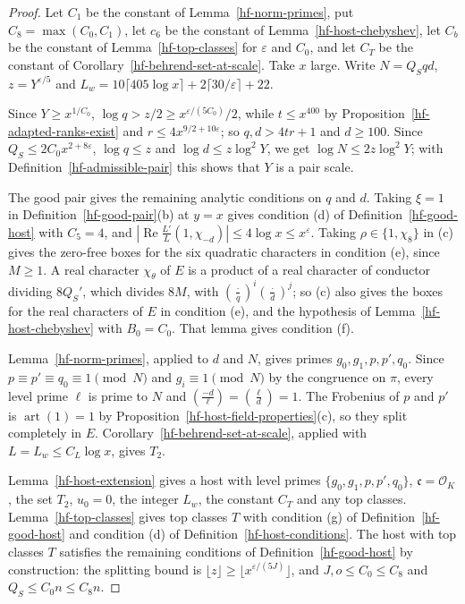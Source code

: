 \begin{proof}
Let $C_1$ be the constant of Lemma~\ref{hf-norm-primes}, put $C_8=\max(C_0,C_1)$, let $c_6$ be the
constant of Lemma~\ref{hf-host-chebyshev}, let $C_b$ be the constant of Lemma~\ref{hf-top-classes}
for $\varepsilon$ and $C_0$, and let $C_T$ be the constant of Corollary~\ref{hf-behrend-set-at-scale}.
Take $x$ large. Write $N=Q_Sqd$, $z=Y^{\varepsilon/5}$ and $L_w=10\lceil405\log x\rceil+
2\lceil30/\varepsilon\rceil+22$.

Since $Y\geq x^{1/C_0}$, $\log q>z/2\geq x^{\varepsilon/(5C_0)}/2$, while $t\leq x^{400}$ by
Proposition~\ref{hf-adapted-ranks-exist} and $r\leq4x^{9/2+10\varepsilon}$; so $q,d>4tr+1$ and
$d\geq100$. Since $Q_S\leq2C_0x^{2+8\varepsilon}$, $\log q\leq z$ and $\log d\leq z\log^2Y$, we get
$\log N\leq2z\log^2Y$; with Definition~\ref{hf-admissible-pair} this shows that $Y$ is a pair scale.

The good pair gives the remaining analytic conditions on $q$ and $d$. Taking $\xi=1$ in
Definition~\ref{hf-good-pair}(b) at $y=x$ gives condition (d) of Definition~\ref{hf-good-host} with
$C_5=4$, and $|\operatorname{Re}\frac{L'}{L}(1,\chi_{-d})|\leq4\log x\leq x^{\varepsilon}$. Taking
$\rho\in\{1,\chi_8\}$ in (c) gives the zero-free boxes for the six quadratic characters in condition
(e), since $M\geq1$. A real character $\chi_\theta$ of $E$ is a product of a real character of
conductor dividing $8Q_S'$, which divides $8M$, with $\left(\frac{\cdot}{q}\right)^i\left(\frac{\cdot}{d}\right)^j$;
so (c) also gives the boxes for the real characters of $E$ in condition (e), and the hypothesis of
Lemma~\ref{hf-host-chebyshev} with $B_0=C_0$. That lemma gives condition (f).

Lemma~\ref{hf-norm-primes}, applied to $d$ and $N$, gives primes $g_0,g_1,p,p',q_0$. Since
$p\equiv p'\equiv q_0\equiv1\pmod N$ and $g_i\equiv1\pmod N$ by the congruence on $\pi$, every level
prime $\ell$ is prime to $N$ and $\left(\frac{-d}{\ell}\right)=\left(\frac{\ell}{d}\right)=1$. The
Frobenius of $p$ and $p'$ is $\operatorname{art}(1)=1$ by Proposition~\ref{hf-host-field-properties}(c),
so they split completely in $E$. Corollary~\ref{hf-behrend-set-at-scale}, applied with $L=L_w\leq
C_L\log x$, gives $T_2$.

Lemma~\ref{hf-host-extension} gives a host with level primes $\{g_0,g_1,p,p',q_0\}$,
$\mathfrak c=\mathcal O_K$, the set $T_2$, $u_0=0$, the integer $L_w$, the constant $C_T$ and any top
classes. Lemma~\ref{hf-top-classes} gives top classes $T$ with condition (g) of
Definition~\ref{hf-good-host} and condition (d) of Definition~\ref{hf-host-conditions}. The host
with top classes $T$ satisfies the remaining conditions of Definition~\ref{hf-good-host} by
construction: the splitting bound is $\lfloor z\rfloor\geq\lfloor x^{\varepsilon/(5J)}\rfloor$, and
$J,o\leq C_0\leq C_8$ and $Q_S\leq C_0n\leq C_8n$.
\end{proof}

